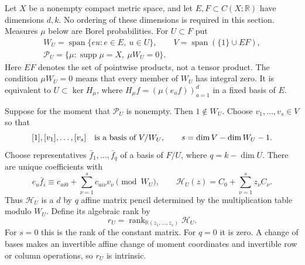 \documentclass[11pt]{amsart}
\theoremstyle{definition}\newtheorem{definition}[theorem]{Definition}
\theoremstyle{remark}\newtheorem{remark}[theorem]{Remark}
\newcommand{\R}{\mathbb R}\newcommand{\N}{\mathbb N}\newcommand{\C}{\mathbb C}
\DeclareMathOperator{\spanop}{span}\DeclareMathOperator{\rank}{rank}
\begin{document}
Let $X$ be a nonempty compact metric space, and let $E,F\subset C(X;\R)$
have dimensions $d,k$. No ordering of these dimensions is required in
this section. Measures $\mu$ below are Borel probabilities. For $U\subset F$ put
\begin{equation}\label{eq:kernel-product-spaces}
 \begin{gathered}
 W_U=\spanop\{eu:e\in E,\ u\in U\},\qquad
 V=\spanop(\{1\}\cup EF),\\
 \mathcal P_U=\{\mu:\operatorname{supp}\mu=X,\ \mu W_U=0\}.
 \end{gathered}
\end{equation}
Here $EF$ denotes the set of pointwise products, not a tensor product.
The condition $\mu W_U=0$ means that every member of $W_U$ has integral
zero. It is equivalent to $U\subset\ker H_\mu$, where
$H_\mu f=(\mu(e_a f))_{a=1}^d$ in a fixed basis of $E$.

Suppose for the moment that $\mathcal P_U$ is nonempty. Then
$1\notin W_U$. Choose $v_1,\ldots,v_s\in V$ so that
\[
 [1],[v_1],\ldots,[v_s]\quad\hbox{is a basis of }V/W_U,
 \qquad s=\dim V-\dim W_U-1.
\]
Choose representatives $\bar f_1,\ldots,\bar f_q$ of a basis of $F/U$,
where $q=k-\dim U$. There are unique coefficients with
\begin{equation}\label{eq:kernel-pencil}
 e_a\bar f_i\equiv c_{ai0}+\sum_{\nu=1}^s c_{ai\nu}v_\nu
       \pmod {W_U},\qquad
 \mathscr H_U(z)=C_0+\sum_{\nu=1}^s z_\nu C_\nu.
\end{equation}
Thus $\mathscr H_U$ is a $d$ by $q$ affine matrix pencil determined by
the multiplication table modulo $W_U$. Define its algebraic rank by
\begin{equation}\label{eq:kernel-generic-rank}
 r_U=\rank_{\R(z_1,\ldots,z_s)}\mathscr H_U.
\end{equation}
For $s=0$ this is the rank of the constant matrix. For $q=0$ it is zero.
A change of bases makes an invertible affine change of moment coordinates
and invertible row or column operations, so $r_U$ is intrinsic.
\end{document}

